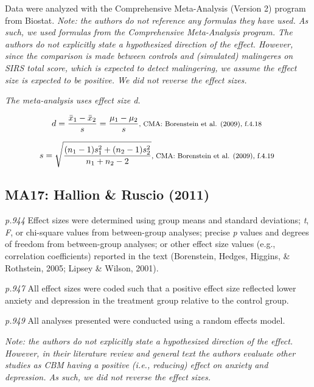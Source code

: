 \documentclass{article}
\begin{document}
Data were analyzed with the Comprehensive Meta-Analysis (Version 2) program from Biostat.
\vspace{3 mm}
\textit{Note: the authors do not reference any formulas they have used. As such, we used formulas from the Comprehensive Meta-Analysis program. The authors do not explicitly state a hypothesized direction of the effect. However, since the comparison is made between controls and (simulated) malingeres on SIRS total score, which is expected to detect malingering, we assume the effect size is expected to be positive. We did not reverse the effect sizes. }

\vspace{3mm}
\textit{The meta-analysis uses effect size d.}

\begin{equation*}
d={\frac {{\bar {x}}_{1}-{\bar {x}}_{2}}{s}}={\frac {\mu_{1}-\mu_{2}}{s}} \mbox{\footnotesize, CMA: Borenstein et al. (2009), f.4.18 } 
\end{equation*}

\begin{equation*}
s={\sqrt {\frac {(n_{1}-1)s_{1}^{2}+(n_{2}-1)s_{2}^{2}}{n_{1}+n_{2}-2}}} \mbox{\footnotesize, CMA: Borenstein et al. (2009), f.4.19 } 
\end{equation*}

\subsection*{MA17: Hallion \& Ruscio (2011)}

\textit{p.944} Effect sizes were determined using group means and standard deviations; \textit{t}, \textit{F}, or chi-square values from between-group analyses; precise \textit{p} values and degrees of freedom from between-group analyses; or other effect size values (e.g., correlation coefficients) reported in the text (Borenstein, Hedges, Higgins, \& Rothstein, 2005; Lipsey \& Wilson, 2001).

\textit{p.947} All effect sizes were coded such that a positive effect size reflected lower anxiety and depression in the treatment group relative to the control group.

\textit{p.949} All analyses presented were conducted using a random effects model.

\vspace{3 mm}
\textit{Note: the authors do not explicitly state a hypothesized direction of the effect. However, in their literature review and general text the authors evaluate other studies as CBM having a positive (i.e., reducing) effect on anxiety and depression. As such, we did not reverse the effect sizes. }
\end{document}

